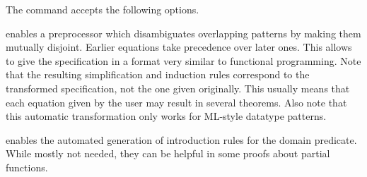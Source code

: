 \begin{isabellebody}
\begin{isamarkuptext}
  The \hyperlink{command.HOL.function}{\mbox{}} command accepts the following
  options.

  \begin{description}

  \item {} enables a preprocessor which disambiguates
  overlapping patterns by making them mutually disjoint.  Earlier
  equations take precedence over later ones.  This allows to give the
  specification in a format very similar to functional programming.
  Note that the resulting simplification and induction rules
  correspond to the transformed specification, not the one given
  originally. This usually means that each equation given by the user
  may result in several theorems.  Also note that this automatic
  transformation only works for ML-style datatype patterns.

  \item {} enables the automated generation of
  introduction rules for the domain predicate. While mostly not
  needed, they can be helpful in some proofs about partial functions.


\end{description}
\end{isamarkuptext}
\end{isabellebody}
